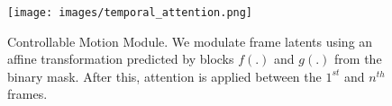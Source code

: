 \begin{figure}
\centering
\texttt{[image: images/temporal\_attention.png]}

\caption{Controllable Motion Module. We modulate frame latents using an affine transformation predicted by blocks \( f(.) \) and \( g(.) \) from the binary mask. After this, attention is applied between the \( 1^{st} \) and \( n^{th} \) frames.}
\vspace{-4mm}
\label{fig:pipeline-temporal}
\end{figure}